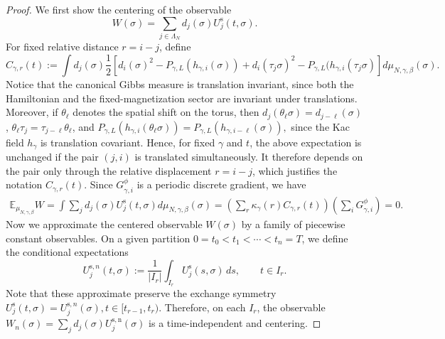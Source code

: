 \documentclass{article}
\begin{document}
\begin{proof}
We first show the centering of the observable 
\[
W(\sigma)=\sum_{j \in \Lambda_N} d_j(\sigma)U_j^{\mathrm{s}}(t,\sigma).
\]
For fixed relative distance \(r=i-j\), define
\[
C_{\gamma,r}(t)
:=
\int
d_j(\sigma)
\frac12
\left[
d_i(\sigma)^2- P_{\gamma,L}(h_{\gamma,i}(\sigma)) + d_i(\tau_j\sigma)^2- P_{\gamma,L}(h_{\gamma,i}(\tau_j \sigma)
\right]
d\mu_{N,\gamma,\beta}(\sigma).
\]
Notice that the canonical Gibbs measure is translation invariant, since both the Hamiltonian and the fixed-magnetization sector are invariant under translations.  
Moreover, if \(\theta_\ell\) denotes the spatial shift on the torus, then
\(d_j(\theta_\ell\sigma)=d_{j-\ell}(\sigma)\),
\(\theta_\ell\tau_j=\tau_{j-\ell}\theta_\ell\), and
\(
P_{\gamma,L}(h_{\gamma,i}(\theta_\ell\sigma))
= P_{\gamma,L}(h_{\gamma,i-\ell}(\sigma)),
\)
since the Kac field \(h_\gamma\) is
translation covariant.  Hence, for fixed \(\gamma\) and \(t\), the above
expectation is unchanged if the pair \((j,i)\) is translated simultaneously.
It therefore depends on the pair only through the relative displacement
\(r=i-j\), which justifies the notation \(C_{\gamma,r}(t)\).
Since \(G_{\gamma,i}^{\phi}\) is a periodic discrete gradient, we have
\[
\begin{aligned}
\mathbb{E}_{\mu_{N,\gamma,\beta}}W  = \int\sum_jd_j(\sigma)U_j^{\mathrm s}(t,\sigma)
d\mu_{N,\gamma,\beta}(\sigma) =
\left(\sum_r\kappa_\gamma(r)C_{\gamma,r}(t)\right)
\left(\sum_iG_{\gamma,i}^{\phi}\right)
=0 .
\end{aligned}
\]
Now we approximate the centered observable $W(\sigma)$ by a family of piecewise constant observables.
On a given partition \(0=t_0<t_1<\cdots<t_n=T\), we define the conditional expectations
\[
U_{j}^{\mathrm s,n}(t,\sigma)
:=
\frac1{|I_r|}
\int_{I_r}U_j^{\mathrm s}(s,\sigma)\,ds,
\qquad t\in I_r .
\]
Note that these approximate preserve the exchange symmetry
\(
U_j^{\mathrm s}(t,\sigma)=U_{j}^{\mathrm s,n}(\sigma), t\in[t_{r-1},t_r).
\)
Therefore, on each $I_r$, the observable
\(
W_n(\sigma)=\sum_j d_j(\sigma)U_j^{\mathrm{s,n}}(\sigma)
\) is a time-independent and centering.


\end{proof}
\end{document}
